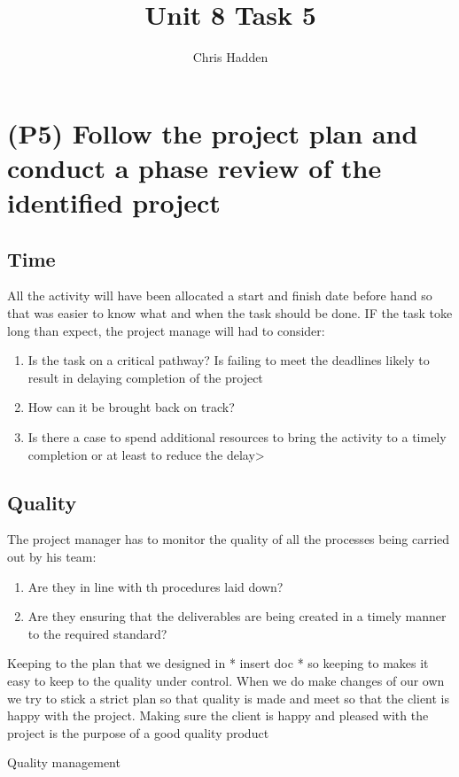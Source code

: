 \documentclass{article}
\begin{document}
\title{Unit 8 Task 5}
\author{Chris Hadden}
\date{}
\maketitle

\section{(P5) Follow the project plan and conduct a phase review of the identified project}
\subsection{Time}
All the activity will have been allocated a start and finish date before hand so that was easier to know what and when the task should be done. IF the task toke long than expect, the project manage will had to consider:
\begin{enumerate}
	\item Is  the task on a critical pathway? Is failing to meet the deadlines likely to result in delaying completion of the project
	\item How can it be brought back on track?
	\item Is there a case to spend additional resources to bring the activity to a timely completion or at least to reduce the delay>
\end{enumerate}

\subsection{Quality}
 The project manager has to monitor the quality of all the processes being carried out by his team:
 \begin{enumerate}
 	\item Are they in line with th procedures laid down?
	\item Are they ensuring that the deliverables are being created in a timely manner to the required standard?
\end{enumerate}

Keeping to the plan that we designed in * insert doc * so keeping to makes it easy to keep to the quality under control. When we do make changes of our own we try to stick a strict plan so that quality is made and meet so that the client is happy with the project. Making sure the client is happy and pleased with the project is the purpose of a good quality product 

Quality management
\end{document}
